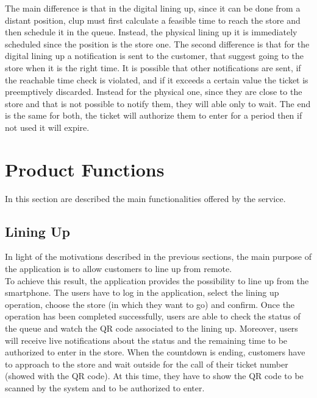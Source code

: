The main difference is that in the digital lining up, since it can be done from a distant position, \gls{clup} must first calculate a feasible time to reach the store and then schedule it in the queue. Instead, the physical lining up it is immediately scheduled since the position is the store one. The second difference is that for the digital lining up a notification is sent to the customer, that suggest going to the store when it is the right time. It is possible that other notifications are sent, if the reachable time check is violated, and if it exceeds a certain value the ticket is preemptively discarded. Instead for the physical one, since they are close to the store and that is not possible to notify them, they will able only to wait.
The end is the same for both, the ticket will authorize them to enter for a period then if not used it will expire.


\section{Product Functions}

In this section are described the main functionalities offered by the service.

\subsection{Lining Up}
In light of the motivations described in the previous sections, the main purpose of the application is to allow customers to line up from remote.\\
To achieve this result, the application provides the possibility to line up from the smartphone.
The users have to log in the application, select the lining up operation, choose the store (in which they want to go) and confirm.
Once the operation has been completed successfully, users are able to check the status of the queue and watch the QR code associated to the lining up.
Moreover, users will receive live notifications about the status and the remaining time to be authorized to enter in the store.
When the countdown is ending, customers have to approach to the store and wait outside for the call of their ticket number (showed with the QR code). At this time, they have to show the QR code to be scanned by the system and to be authorized to enter.

